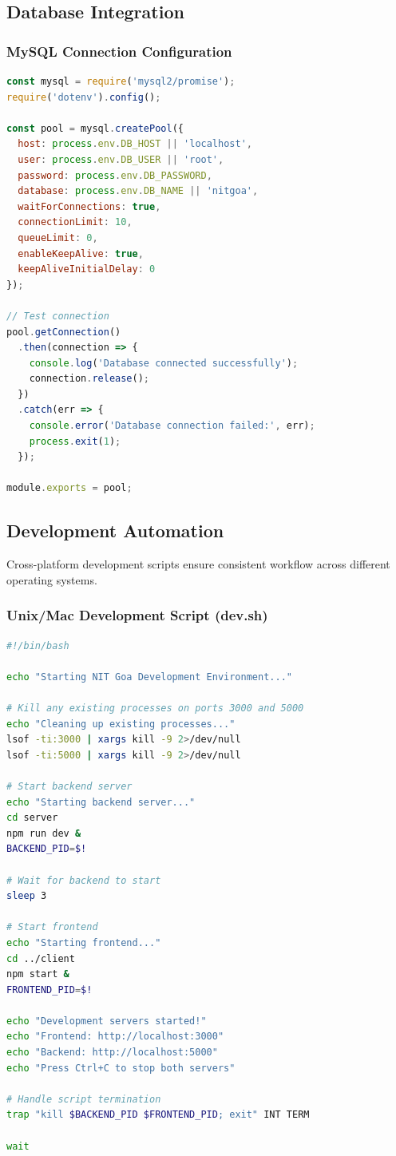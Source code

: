 \documentclass[12pt,a4paper]{report}
\begin{document}
\subsection{Database Integration}

\subsubsection*{MySQL Connection Configuration}

\begin{lstlisting}[language=JavaScript, caption=Database Configuration]
const mysql = require('mysql2/promise');
require('dotenv').config();

const pool = mysql.createPool({
  host: process.env.DB_HOST || 'localhost',
  user: process.env.DB_USER || 'root',
  password: process.env.DB_PASSWORD,
  database: process.env.DB_NAME || 'nitgoa',
  waitForConnections: true,
  connectionLimit: 10,
  queueLimit: 0,
  enableKeepAlive: true,
  keepAliveInitialDelay: 0
});

// Test connection
pool.getConnection()
  .then(connection => {
    console.log('Database connected successfully');
    connection.release();
  })
  .catch(err => {
    console.error('Database connection failed:', err);
    process.exit(1);
  });

module.exports = pool;
\end{lstlisting}

\subsection{Development Automation}

Cross-platform development scripts ensure consistent workflow across different operating systems.

\subsubsection*{Unix/Mac Development Script (dev.sh)}

\begin{lstlisting}[language=bash, caption=Development Script for Unix/Mac]
#!/bin/bash

echo "Starting NIT Goa Development Environment..."

# Kill any existing processes on ports 3000 and 5000
echo "Cleaning up existing processes..."
lsof -ti:3000 | xargs kill -9 2>/dev/null
lsof -ti:5000 | xargs kill -9 2>/dev/null

# Start backend server
echo "Starting backend server..."
cd server
npm run dev &
BACKEND_PID=$!

# Wait for backend to start
sleep 3

# Start frontend
echo "Starting frontend..."
cd ../client
npm start &
FRONTEND_PID=$!

echo "Development servers started!"
echo "Frontend: http://localhost:3000"
echo "Backend: http://localhost:5000"
echo "Press Ctrl+C to stop both servers"

# Handle script termination
trap "kill $BACKEND_PID $FRONTEND_PID; exit" INT TERM

wait
\end{lstlisting}
\end{document}
